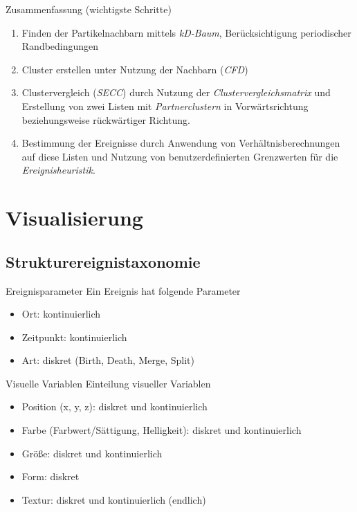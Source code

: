 \documentclass[10pt]{beamer}
\newcommand{\wichtig}[1]{\textit{#1}}
\begin{document}
\begin{frame}{Zusammenfassung (wichtigste Schritte)}
	\begin{enumerate}
		\item Finden der Partikelnachbarn mittels \wichtig{kD-Baum}, Berücksichtigung periodischer Randbedingungen
		\item Cluster erstellen unter Nutzung der Nachbarn (\wichtig{CFD})
		\item Clustervergleich (\wichtig{SECC}) durch Nutzung der \wichtig{Clustervergleichsmatrix} und Erstellung von zwei Listen mit \wichtig{Partnerclustern} in Vorwärtsrichtung beziehungsweise rückwärtiger Richtung.
		\item Bestimmung der Ereignisse durch Anwendung von Verhältnisberechnungen auf diese Listen und Nutzung von benutzerdefinierten Grenzwerten für die \wichtig{Ereignisheuristik}.
	\end{enumerate}
\end{frame}

\section{Visualisierung}

\subsection{Strukturereignistaxonomie}
\begin{frame}{Ereignisparameter}
	Ein Ereignis hat folgende Parameter
	\begin{itemize}
		\item Ort: kontinuierlich
		\item Zeitpunkt: kontinuierlich
		\item Art: diskret (Birth, Death, Merge, Split)
	\end{itemize}
\end{frame}

\begin{frame}{Visuelle Variablen}
	Einteilung visueller Variablen
	\begin{itemize}
		\item Position (x, y, z): diskret und kontinuierlich
		\item Farbe (Farbwert/Sättigung, Helligkeit): diskret und kontinuierlich
		\item Größe: diskret und kontinuierlich
		\item Form: diskret
		\item Textur: diskret und kontinuierlich (endlich)
	\end{itemize}
\end{frame}
\end{document}

